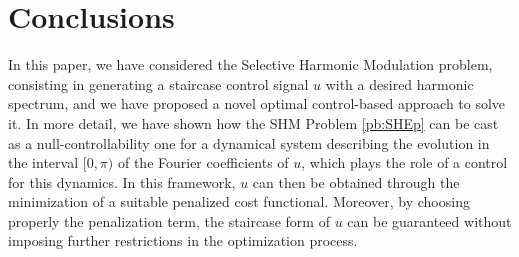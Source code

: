 \documentclass[twocolumn]{autart}    %
\begin{document}
%
%

\section{Conclusions}\label{sec:conclusions}

In this paper, we have considered the Selective Harmonic Modulation problem, consisting in generating a staircase control signal $u$ with a desired harmonic spectrum, and we have proposed a novel optimal control-based approach to solve it. In more detail, we have shown how the SHM Problem \eqref{pb:SHEp} can be cast as a null-controllability one for a dynamical system describing the evolution in the interval $[0,\pi)$ of the Fourier coefficients of $u$, which plays the role of a control for this dynamics. In this framework, $u$ can then be obtained through the minimization of a suitable penalized cost functional. Moreover, by choosing properly the penalization term, the staircase form of $u$ can be guaranteed without imposing further restrictions in the optimization process.
\end{document}
